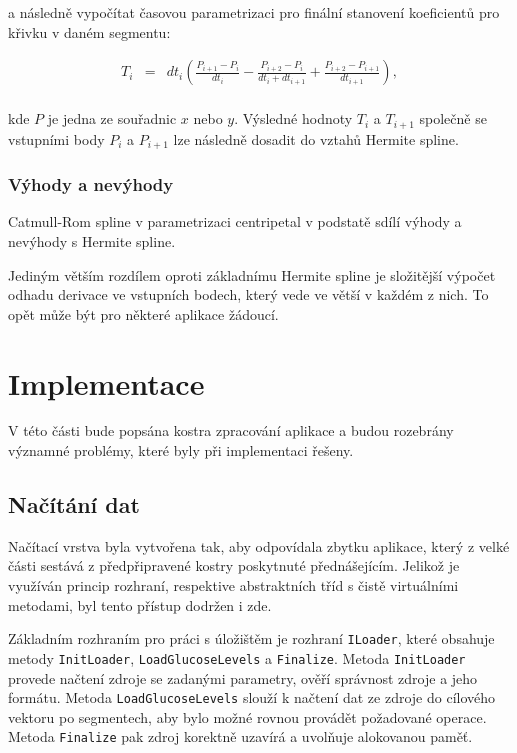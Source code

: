 \documentclass[]{thesiskiv}
\begin{document}
a následně vypočítat časovou parametrizaci pro finální stanovení koeficientů pro křivku v daném segmentu:

\begin{equation}
\begin{array}{rcl}
 T_i & = & dt_{i} ( \frac{P_{i+1} - P_i}{dt_{i}} - \frac{P_{i+2} - P_i}{dt_{i} + dt_{i+1}} + \frac{P_{i+2} - P_{i+1}}{dt_{i+1}} ), \\
\end{array}
\end{equation}

kde $P$ je jedna ze souřadnic $x$ nebo $y$. Výsledné hodnoty $T_i$ a $T_{i+1}$ společně se vstupními body $P_i$ a $P_{i+1}$ lze následně dosadit do vztahů Hermite spline.

\subsection*{Výhody a nevýhody}

Catmull-Rom spline v parametrizaci centripetal v podstatě sdílí výhody a nevýhody s Hermite spline.

Jediným větším rozdílem oproti základnímu Hermite spline je složitější výpočet odhadu derivace ve vstupních bodech, který vede ve větší  v každém z nich. To opět může být pro některé aplikace žádoucí.



\chapter{Implementace}

V této části bude popsána kostra zpracování aplikace a budou rozebrány významné problémy, které byly při implementaci řešeny.

\section{Načítání dat}

Načítací vrstva byla vytvořena tak, aby odpovídala zbytku aplikace, který z velké části sestává z předpřipravené kostry poskytnuté přednášejícím. Jelikož je využíván princip rozhraní, respektive abstraktních tříd s čistě virtuálními metodami, byl tento přístup dodržen i zde.

Základním rozhraním pro práci s úložištěm je rozhraní \texttt{ILoader}, které obsahuje metody \texttt{InitLoader}, \texttt{LoadGlucoseLevels} a \texttt{Finalize}. Metoda \texttt{InitLoader} provede načtení zdroje se zadanými parametry, ověří správnost zdroje a jeho formátu. Metoda \texttt{LoadGlucoseLevels} slouží k načtení dat ze zdroje do cílového vektoru po segmentech, aby bylo možné rovnou provádět požadované operace. Metoda \texttt{Finalize} pak zdroj korektně uzavírá a uvolňuje alokovanou paměť.
\end{document}
